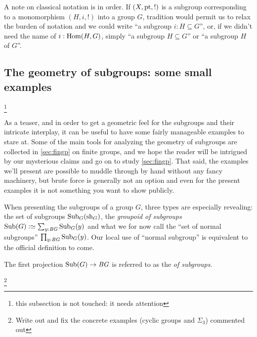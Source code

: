       \begin{remark}
      \label{rem:notationsubgroup}
      A note on classical notation is in order.
If $(X,\mathrm{pt},!)$ is a subgroup corresponding to a monomorphism $(H,i,!)$ into a group $G$, tradition would permit us to relax the burden of notation and we could write ``a subgroup $i:H\subseteq G$'', or, if we didn't need the name of $i:\Hom(H,G)$, simply ``a subgroup $H\subseteq G$'' or ``a subgroup $H$ of $G$''.
    \end{remark}

\subsection{The geometry of subgroups: some small examples}\footnote{this subsection is not touched: it needs attention}
\label{smallsubgpex}

As a teaser, and in order to get a geometric feel for the subgroups and their intricate interplay, it can be useful to have some fairly manageable examples to stare at.
Some of the main tools for analyzing the geometry of subgroups are collected in \cref{sec:fingp} on finite groups, and we hope the reader will be intrigued by our mysterious claims and go on to study \cref{sec:fingp}.
That said, the examples we'll present are possible to muddle through by hand without any fancy machinery, but brute force is generally not an option and even for the present examples it is not something you want to show publicly.

When presenting the subgroups of a group $G$, three types are especially revealing: the set of subgroups $\mathrm{Sub}_G(\mathrm{sh}_G)$, the \emph{groupoid of subgroups} $\typesubgroup(G)\defequi\sum_{y:\BG}\typesubgroup_G(y)$ and what we for now call the ``set of normal subgroups'' $\prod_{y:\mathit{B}\mathit{G}}\mathrm{Sub}_G(y)$.   Our local use of ``normal subgroup'' is equivalent to the official definition to come.

The first projection $\mathrm{Sub}(G)\to \mathit{B}\mathit{G}$ is referred to as the \emph{\covering of subgroups}.

\footnote{Write out and fix the concrete examples (cyclic groups and $\Sigma_3$) commented out}

